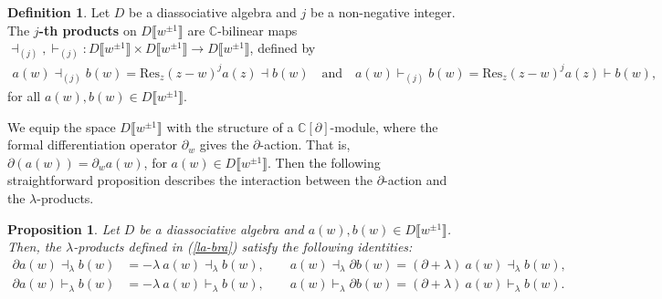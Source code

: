 \documentclass[a4paper,reqno,10pt]{amsart}
\theoremstyle{plain}
\newtheorem{proposition}[thm]{Proposition}
\theoremstyle{definition}
\newtheorem{definition}[thm]{Definition}
\theoremstyle{remark}
\newcommand{\C}{\mathbb{C}}
\newcommand{\p}{\partial}
\newcommand{\la}{\lambda}
\begin{document}
 \begin{definition} \label{D-j}
 Let $D$ be a diassociative algebra and $j$ be a non-negative integer. The {\bf $j$-th products} on $D\llbracket w^{\pm1}\rrbracket$ are $\C$-bilinear maps $\dashv_{(j)}, \vdash_{(j)}: D \llbracket w^{\pm 1 }\rrbracket \times D \llbracket w^{\pm 1 } \rrbracket \rightarrow D \llbracket w^{\pm 1 }\rrbracket$, defined by 
    \begin{align}\label{j-th}
      a(w) \dashv_{(j)} b(w)  = \text{Res}_{z}(z-w)^{j}a(z) \dashv b(w) ~~~\text{ and } ~~~  a(w) \vdash_{(j)} b(w) = \text{Res}_{z}(z-w)^{j}a(z) \vdash b(w),
    \end{align}
    for all $a(w),b(w) \in D\llbracket w^{\pm1}\rrbracket$.
 \end{definition}
 
We equip the space $D\llbracket w^{\pm1}\rrbracket$ with the structure of a $\C[\partial]$-module, where the formal differentiation operator $\partial_w$ gives the $\partial$-action. That is, $\partial (a (w)) =\p_wa(w)$, for $a(w)\in D\llbracket w^{\pm1}\rrbracket$. Then the following straightforward proposition describes the interaction between the $\partial$-action and the $\la$-products.
\begin{proposition}\label{c.s.lap}
   Let $D$ be a diassociative algebra and $a(w), b(w) \in D\llbracket w^{\pm1}\rrbracket$.  Then, the $\la$-products defined in (\ref{la-bra}) satisfy the following identities:
    \begin{align*}
        \p a(w) \dashv_{\la} b(w) &= - \la ~ \! a(w) \dashv_{\la} b(w), \qquad  a(w) \dashv_{\la} \p  b(w) = (\p + \la) ~ \! a(w) \dashv_{\la} b(w), \\
        \p a(w) \vdash_{\la} b(w) &= - \la ~ \! a(w) \vdash_{\la} b(w), \qquad  a(w) \vdash_{\la} \p  b(w) = (\p + \la) ~ \!  a(w) \vdash_{\la} b(w).
    \end{align*}
\end{proposition}
    
\end{document}

